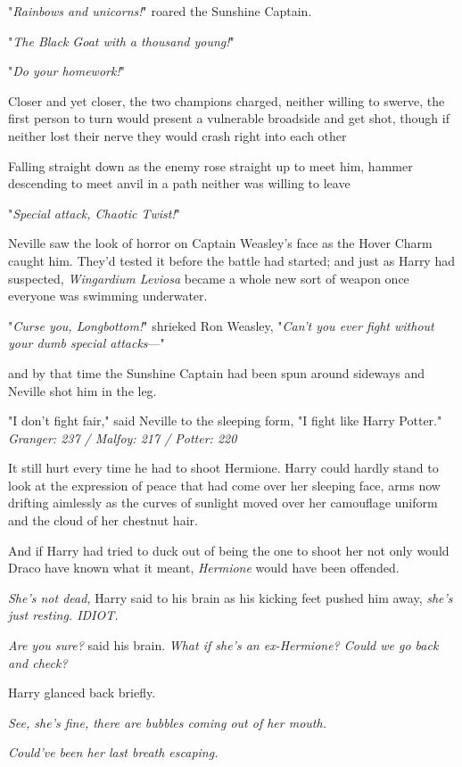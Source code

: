 "\emph{Rainbows and unicorns!}" roared the Sunshine Captain.

"\emph{The Black Goat with a thousand young!}"

"\emph{Do your homework!}"

Closer and yet closer, the two champions charged, neither willing to swerve,
the first person to turn would present a vulnerable broadside and get shot,
though if neither lost their nerve they would crash right into each
other{\el}

Falling straight down as the enemy rose straight up to meet him, hammer
descending to meet anvil in a path neither was willing to leave{\el}

"\emph{Special attack, Chaotic Twist!}"

Neville saw the look of horror on Captain Weasley's face as the Hover Charm
caught him. They'd tested it before the battle had started; and just as Harry
had suspected, \emph{Wingardium Leviosa} became a whole new sort of weapon once
everyone was swimming underwater.

"\emph{Curse you, Longbottom!}" shrieked Ron Weasley, "\emph{Can't you ever
fight without your dumb special attacks}---"

and by that time the Sunshine Captain had been spun around sideways and Neville
shot him in the leg.

"I don't fight fair," said Neville to the sleeping form, "I fight like Harry
Potter."
\sbreak
\emph{Granger: 237 / Malfoy: 217 / Potter: 220}

It still hurt every time he had to shoot Hermione. Harry could hardly stand to
look at the expression of peace that had come over her sleeping face, arms now
drifting aimlessly as the curves of sunlight moved over her camouflage uniform
and the cloud of her chestnut hair.

And if Harry had tried to duck out of being the one to shoot her{\el} not
only would Draco have known what it meant, \emph{Hermione} would have been
offended.

\emph{She's not dead,} Harry said to his brain as his kicking feet pushed him
away, \emph{she's just resting. IDIOT.}

\emph{Are you sure?} said his brain. \emph{What if she's an ex-Hermione? Could
we go back and check?}

Harry glanced back briefly.

\emph{See, she's fine, there are bubbles coming out of her mouth.}

\emph{Could've been her last breath escaping.}

